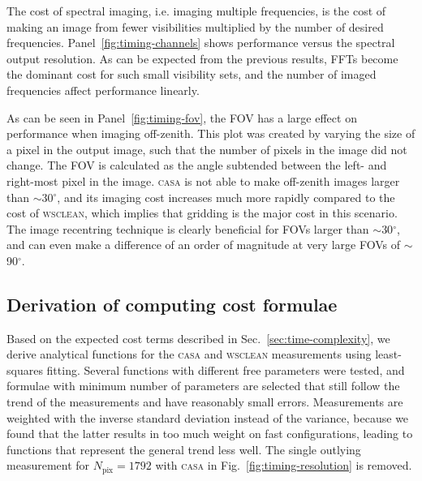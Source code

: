 \documentclass[useAMS,usenatbib]{mn2e}
\newcommand{\editmark}[1]{#1}
\newcommand{\degree}{\ensuremath{^{\circ}}\xspace}
\begin{document}
The cost of spectral imaging, i.e. imaging multiple frequencies, is the cost of making an image from fewer visibilities multiplied by the number of desired frequencies. Panel~\ref{fig:timing-channels} shows performance versus the spectral output resolution. As can be expected from the previous results, FFTs become the dominant cost for such small visibility sets, and the number of imaged frequencies affect performance linearly.

As can be seen in Panel~\ref{fig:timing-fov}, the FOV has a large \editmark{effect} on performance when imaging off-zenith. This plot was created by varying the size of a pixel in the output image, such that the number of pixels in the image did not change. The FOV is calculated as the angle subtended between the left- and right-most pixel in the image. \textsc{casa} is not able to make off-zenith images larger than $\sim$30\degree, and its imaging cost increases much more rapidly compared to the cost of \textsc{wsclean}, which implies that gridding is the major cost in this scenario. The image recentring technique is clearly beneficial for FOVs larger than $\sim$30\degree, and can even make a difference of an order of magnitude at very large FOVs of $\sim$90\degree.

\subsection{Derivation of computing cost formulae}
Based on the expected cost terms described in Sec.~\ref{sec:time-complexity}, we derive analytical functions for the \textsc{casa} and \textsc{wsclean} measurements using least-squares fitting. Several functions with different free parameters were tested, and formulae with minimum number of parameters are selected that still follow the trend of the measurements and have reasonably small errors. Measurements are weighted with the inverse standard deviation instead of the variance, because we found that the latter results in too much weight on fast configurations, leading to functions that represent the general trend less well. The single outlying measurement for $N_\textrm{pix}=1792$ with \textsc{casa} in Fig.~\ref{fig:timing-resolution} is removed.
\end{document}

